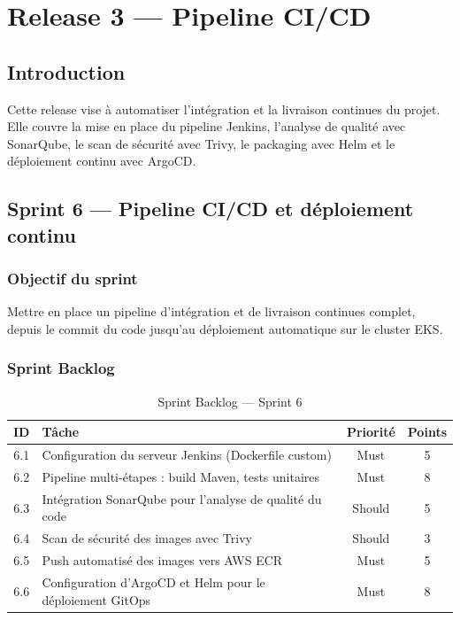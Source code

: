 \chapter{Release 3 --- Pipeline CI/CD}

\section*{Introduction}
Cette release vise à automatiser l'intégration et la livraison continues du projet. Elle couvre la mise en place du pipeline Jenkins, l'analyse de qualité avec SonarQube, le scan de sécurité avec Trivy, le packaging avec Helm et le déploiement continu avec ArgoCD.

\section{Sprint 6 --- Pipeline CI/CD et déploiement continu}

\subsection{Objectif du sprint}
Mettre en place un pipeline d'intégration et de livraison continues complet, depuis le commit du code jusqu'au déploiement automatique sur le cluster EKS.

\subsection{Sprint Backlog}

\begin{table}[H]
\centering
\renewcommand{\arraystretch}{1.2}
\begin{tabular}{|c|p{9cm}|c|c|}
\hline
\textbf{ID} & \textbf{Tâche} & \textbf{Priorité} & \textbf{Points} \\
\hline
6.1 & Configuration du serveur Jenkins (Dockerfile custom) & Must & 5 \\
\hline
6.2 & Pipeline multi-étapes : build Maven, tests unitaires & Must & 8 \\
\hline
6.3 & Intégration SonarQube pour l'analyse de qualité du code & Should & 5 \\
\hline
6.4 & Scan de sécurité des images avec Trivy & Should & 3 \\
\hline
6.5 & Push automatisé des images vers AWS ECR & Must & 5 \\
\hline
6.6 & Configuration d'ArgoCD et Helm pour le déploiement GitOps & Must & 8 \\
\hline
\end{tabular}
\caption{Sprint Backlog --- Sprint 6}
\label{tab:sprint6_backlog}
\end{table}

